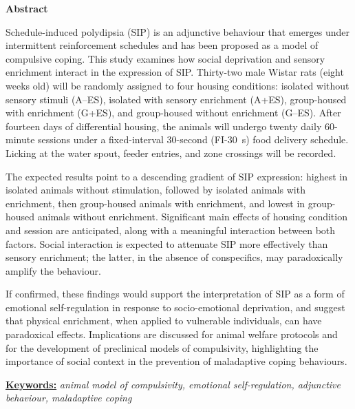 \documentclass[12pt,a4paper]{article}
\begin{document}
    \begin{center}
    \textbf{\large Abstract}
    \end{center}
    
    \begin{center}
    \begin{minipage}{0.9\textwidth}
    \noindent
    Schedule-induced polydipsia (SIP) is an adjunctive behaviour that emerges under intermittent reinforcement schedules and has been proposed as a model of compulsive coping. This study examines how social deprivation and sensory enrichment interact in the expression of SIP. Thirty-two male Wistar rats (eight weeks old) will be randomly assigned to four housing conditions: isolated without sensory stimuli (A--ES), isolated with sensory enrichment (A+ES), group-housed with enrichment (G+ES), and group-housed without enrichment (G--ES). After fourteen days of differential housing, the animals will undergo twenty daily 60-minute sessions under a fixed-interval 30-second (FI-30~s) food delivery schedule. Licking at the water spout, feeder entries, and zone crossings will be recorded.

    The expected results point to a descending gradient of SIP expression: highest in isolated animals without stimulation, followed by isolated animals with enrichment, then group-housed animals with enrichment, and lowest in group-housed animals without enrichment. Significant main effects of housing condition and session are anticipated, along with a meaningful interaction between both factors. Social interaction is expected to attenuate SIP more effectively than sensory enrichment; the latter, in the absence of conspecifics, may paradoxically amplify the behaviour.

    If confirmed, these findings would support the interpretation of SIP as a form of emotional self-regulation in response to socio-emotional deprivation, and suggest that physical enrichment, when applied to vulnerable individuals, can have paradoxical effects. Implications are discussed for animal welfare protocols and for the development of preclinical models of compulsivity, highlighting the importance of social context in the prevention of maladaptive coping behaviours.
    
    \vspace{2mm}
    \noindent
    \underline{\textbf{Keywords:}} \textit{animal model of compulsivity, emotional self-regulation, adjunctive behaviour, maladaptive coping}
    \end{minipage}
    \end{center}
    
\end{document}
